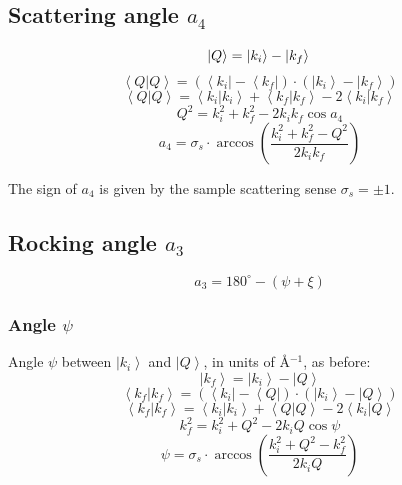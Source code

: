 \subsection*{Scattering angle $a_4$}

\begin{equation} \left| Q \right> = \left| k_i \right> - \left| k_f \right> \\ \end{equation}
\begin{equation} \left< Q | Q \right> = \left( \left< k_i \right| - \left< k_f \right| \right) \cdot \left( \left| k_i \right> - \left| k_f \right> \right) \end{equation}
\begin{equation} \left< Q | Q \right> = \left< k_i | k_i \right> + \left< k_f | k_f \right> - 2 \left< k_i | k_f \right> \end{equation}
\begin{equation} Q^2 = k_i^2 + k_f^2 - 2 k_i k_f \cos a_4 \end{equation}
\begin{equation} \boxed{ a_4 = \sigma_s \cdot \arccos \left( \frac{k_i^2 + k_f^2 - Q^2}{2 k_i k_f} \right) } \end{equation}

The sign of $a_4$ is given by the sample scattering sense $\sigma_s = \pm 1$.




\subsection*{Rocking angle $a_3$}

\begin{equation} \boxed{ a_3 = 180^{\circ} - \left( \psi + \xi \right) } \end{equation}


\subsubsection*{Angle $\psi$}
Angle $\psi$ between $\left| k_i \right>$ and $\left| Q \right>$, in units of \AA{}$^{-1}$, as before:
\begin{equation} \left| k_f \right> = \left| k_i \right> - \left| Q \right> \end{equation}
\begin{equation} \left< k_f | k_f \right> = \left( \left< k_i \right| - \left< Q \right| \right) \cdot \left( \left| k_i \right> - \left| Q \right> \right) \end{equation}
\begin{equation} \left< k_f | k_f \right> = \left< k_i | k_i \right> + \left< Q | Q \right> - 2 \left< k_i | Q \right> \end{equation}
\begin{equation} k_f^2 = k_i^2 + Q^2 - 2 k_i Q \cos \psi \end{equation}
\begin{equation} \boxed{ \psi = \sigma_s \cdot \arccos \left( \frac{k_i^2 + Q^2 - k_f^2}{2 k_i Q} \right) } \end{equation}


